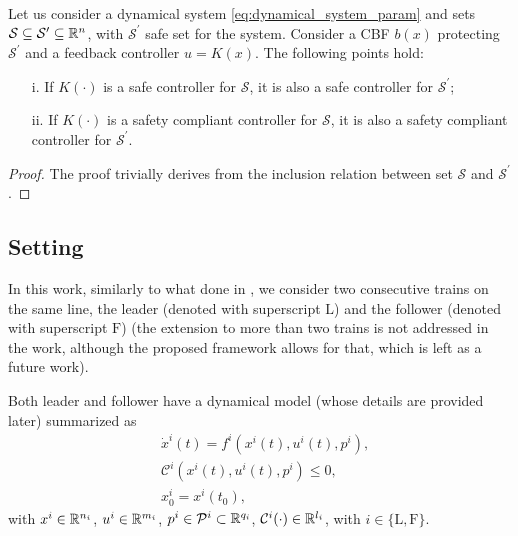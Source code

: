 \begin{lemma}\label{lem:protecting_barrier}
	Let us consider a dynamical system  \eqref{eq:dynamical_system_param} and sets $\mathcal{S}\subseteq\mathcal{S}^\prime\subseteq \Bbb{R}^n$, with $\mathcal{S}^\prime$ safe set for the system. Consider a CBF $b(x)$ protecting $\mathcal{S}^\prime$ and a feedback controller $u=K(x)$. The following points hold:
	\begin{itemize}
		\item [i.] If $K(\cdot)$ is a safe controller for $\mathcal{S}$, it is also a safe controller for $\mathcal{S}^\prime$;
		\item [ii.] If $K(\cdot)$ is a safety compliant controller for $\mathcal{S}$, it is also a safety compliant controller for $\mathcal{S}^\prime$.
	\end{itemize}
	
	\begin{proof}
		The proof trivially derives from the inclusion relation between set  $\mathcal{S}$ and $\mathcal{S}^\prime$.
	\end{proof}
\end{lemma}




\subsection{Setting}
\label{subsec:setting}
In this work, similarly to what done in \cite{felez2019model}, we consider two consecutive trains on the same line, the leader (denoted with superscript $\mathrm{L}$) and the follower (denoted with superscript $\mathrm{F}$) (the extension to more than two trains is not addressed in the work, although the proposed framework allows for that, which is left as a future work).

Both leader and follower have a dynamical model (whose details are provided later) summarized as 
\begin{subequations}\label{eq:dynamical_system_param_i}
	\begin{align}
		& \dot{x}^i(t) = f^i(x^i(t), u^i(t),p^i), \label{eq:dynamical_system_param_i_dynamics}\\
		& \mathcal{C}^i(x^i(t),u^i(t),p^i)\leq 0, \label{eq:dynamical_system_param_i_constraints}\\
		& x_0^i=x^i(t_0), \label{eq:dynamical_system_param_i_initial}
	\end{align}
\end{subequations}
with $x^i\in \Bbb{R}^{n_i}$, $u^i\in \Bbb{R}^{m_i}$,  $p^i\in \mathcal{P}^i\subset \Bbb{R}^{q_i}$, $\mathcal{C}^i(\cdot)\in \Bbb{R}^{l_i}$, with $i\in\{\mathrm{L}, \mathrm{F}\}$. 


